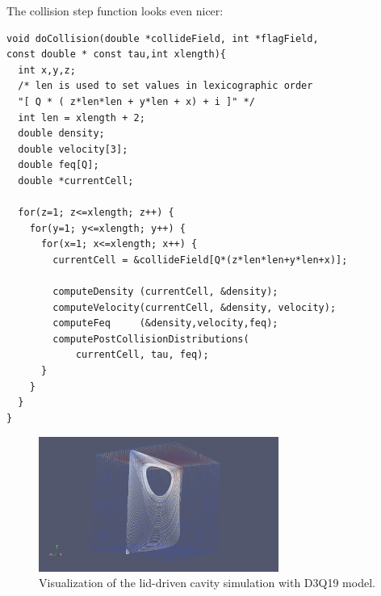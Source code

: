 The collision step function looks even nicer:
\begin{lstlisting}
void doCollision(double *collideField, int *flagField,
const double * const tau,int xlength){
  int x,y,z;
  /* len is used to set values in lexicographic order
  "[ Q * ( z*len*len + y*len + x) + i ]" */
  int len = xlength + 2;
  double density;
  double velocity[3];
  double feq[Q];
  double *currentCell;

  for(z=1; z<=xlength; z++) {
    for(y=1; y<=xlength; y++) {
      for(x=1; x<=xlength; x++) {
        currentCell = &collideField[Q*(z*len*len+y*len+x)];

        computeDensity (currentCell, &density);
        computeVelocity(currentCell, &density, velocity);
        computeFeq     (&density,velocity,feq);
        computePostCollisionDistributions(
            currentCell, tau, feq);
      }
    }
  }
}
\end{lstlisting}


\begin{figure}[H]
  \centering
  \includegraphics[width=0.7\textwidth]{img/fig10.png}
  \caption{Visualization of the lid-driven cavity simulation with D3Q19 model.}
\end{figure}
